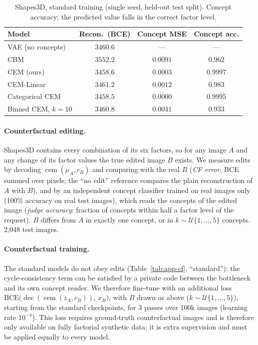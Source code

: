 \begin{table}[h]
\centering\small
\caption{Shapes3D, standard training (single seed, held-out test split).
Concept accuracy: the predicted value falls in the correct factor level.}
\label{tab:app-shapes3d}
\begin{tabular}{lccc}
\toprule
\textbf{Model} & \textbf{Recon.\ (BCE)} & \textbf{Concept MSE} & \textbf{Concept acc.} \\
\midrule
VAE (no concepts)      & $3460.6$ & ---      & ---      \\
CBM                    & $3552.2$ & $0.0091$ & $0.962$  \\
CEM (ours)             & $3458.6$ & $0.0003$ & $\mathbf{0.9997}$ \\
CEM-Linear             & $3461.2$ & $0.0012$ & $0.983$  \\
Categorical CEM        & $\mathbf{3458.5}$ & $0.0000$ & $0.9995$ \\
Binned CEM, $k{=}10$   & $3460.8$ & $0.0041$ & $0.933$  \\
\bottomrule
\end{tabular}
\end{table}

\paragraph{Counterfactual editing.} Shapes3D contains every combination of
its six factors, so for any image $A$ and any change of its factor values the
true edited image $B$ exists. We measure edits by decoding
$\operatorname{cem}(\mu_A, c_B)$ and comparing with the real $B$
(\emph{CF error}, BCE summed over pixels; the ``no edit'' reference compares the
plain reconstruction of $A$ with $B$), and by an independent concept classifier
trained on real images only (100\% accuracy on real test images), which reads
the concepts of the edited image (\emph{judge accuracy}: fraction of concepts
within half a factor level of the request). $B$ differs from $A$ in exactly one
concept, or in $k \sim \mathcal{U}\{1, \dots, 5\}$ concepts.
2{,}048 test images.

\paragraph{Counterfactual training.} The standard models do not obey edits
(Table~\ref{tab:app-cf}, ``standard''): the cycle-consistency term can be
satisfied by a private code between the bottleneck and its own concept reader.
We therefore fine-tune with an additional loss
$\mathrm{BCE}\big(\operatorname{dec}(\operatorname{cem}(z_A, c_B)),\, x_B\big)$,
with $B$ drawn as above ($k \sim \mathcal{U}\{1, \dots, 5\}$), starting from the
standard checkpoints, for 3 passes over 100k images (learning rate $10^{-4}$).
This loss requires ground-truth counterfactual images and is therefore only
available on fully factorial synthetic data; it is extra supervision and must
be applied equally to every model. 

